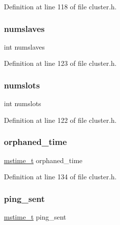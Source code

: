 Definition at line 118 of file cluster.\+h.

\mbox{\label{structcluster_node_a0fc6a1a68f27049fc36cc42bf7c96208}} 
\subsubsection{\texorpdfstring{numslaves}{numslaves}}
{\footnotesize\ttfamily int numslaves}



Definition at line 123 of file cluster.\+h.

\mbox{\label{structcluster_node_a349a9876a2d953d6c146f1b324d5cc8a}} 
\subsubsection{\texorpdfstring{numslots}{numslots}}
{\footnotesize\ttfamily int numslots}



Definition at line 122 of file cluster.\+h.

\mbox{\label{structcluster_node_a27ce082b4aebffb71dfb9b03c0ce412b}} 
\subsubsection{\texorpdfstring{orphaned\+\_\+time}{orphaned\_time}}
{\footnotesize\ttfamily \hyperlink{redismodule_8h_a652ae61e2475bc8957454534544968fc}{mstime\+\_\+t} orphaned\+\_\+time}



Definition at line 134 of file cluster.\+h.

\mbox{\label{structcluster_node_a83ac63444059326fd11192ee837f5237}} 
\subsubsection{\texorpdfstring{ping\+\_\+sent}{ping\_sent}}
{\footnotesize\ttfamily \hyperlink{redismodule_8h_a652ae61e2475bc8957454534544968fc}{mstime\+\_\+t} ping\+\_\+sent}




